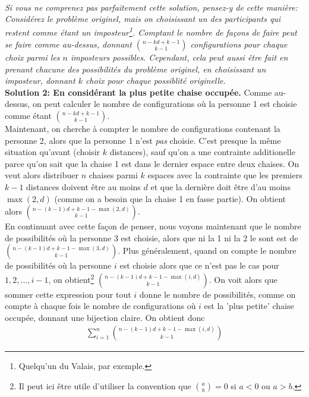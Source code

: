 {\\
\emph{Si vous ne comprenez pas parfaitement cette solution, pensez-y de cette manière: Considérez le problème originel, mais on choisissant un des participants qui restent comme étant un imposteur\footnote{Quelqu'un du Valais, par exemple.}. Comptant le nombre de façons de faire peut se faire comme au-dessus, donnant $\binom{n-kd+k-1}{k-1}$ configurations pour chaque choix parmi les $n$ imposteurs possibles. Cependant, cela peut aussi être fait en prenant chacune des possibilités du problème originel, en choisissant un imposteur, donnant $k$ choix pour chaque possiblité originelle.}\\

\textbf{Solution 2: En considérant la plus petite chaise occupée.} Comme au-dessus, on peut calculer le nombre de configurations où la personne 1 est choisie comme étant $\binom{n-kd+k-1}{k-1}$.\\ Maintenant, on cherche à compter le nombre de configurations contenant la personne 2, alors que la personne 1 n'est \emph{pas} choisie. C'est presque la même situation qu'avant (choisir $k$ distances), sauf qu'on a une contrainte additionelle parce qu'on sait que la chaise 1 est dans le dernier espace entre deux chaises. On veut alors distribuer $n$ chaises parmi $k$ espaces avec la contrainte que les premiers $k-1$ distances doivent être au moins $d$ et que la dernière doit être d'au moins $\max(2,d)$ (comme on a besoin que la chaise 1 en fasse partie). On obtient alors $\binom{n-(k-1)d+k-1-\max(2,d)}{k-1}$.\\
En continuant avec cette façon de penser, nous voyons maintenant que le nombre de possibilités où la personne $3$ est choisie, alors que ni la 1 ni la 2 le sont est de $\binom{n-(k-1)d+k-1-\max(3,d)}{k-1}$. Plus généralement, quand on compte le nombre de possibilités où la personne $i$ est choisie alors que ce n'est pas le cas pour $1, 2, \dots, i-1$, on obtient\footnote{Il peut ici être utile d'utiliser la convention que $\binom{a}{b} = 0$ si $a < 0$ ou $a > b$.} $\binom{n-(k-1)d+k-1-\max(i,d)}{k-1}$. On voit alors que sommer cette expression pour tout $i$ donne le nombre de possibilités, comme on compte à chaque fois le nombre de configurations où $i$ est la 'plus petite' chaise occupée, donnant une bijection claire. On obtient donc
\begin{align*}
    \sum_{i=1}^{n} \binom{n-(k-1)d+k-1-\max(i,d)}{k-1} 
\end{align*}

\bigskip 

}
